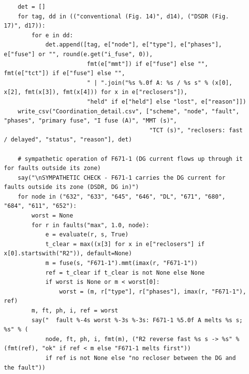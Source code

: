\documentclass[12pt,a4paper]{article}
\begin{document}
\begin{lstlisting}
    det = []
    for tag, dd in (("conventional (Fig. 14)", d14), ("DSDR (Fig. 17)", d17)):
        for e in dd:
            det.append([tag, e["node"], e["type"], e["phases"], e["fuse"] or "", round(e.get("i_fuse", 0)),
                        fmt(e["mmt"]) if e["fuse"] else "", fmt(e["tct"]) if e["fuse"] else "",
                        " | ".join("%s %.0f A: %s / %s s" % (x[0], x[2], fmt(x[3]), fmt(x[4])) for x in e["reclosers"]),
                        "held" if e["held"] else "lost", e["reason"]])
    write_csv("Coordination_detail.csv", ["scheme", "node", "fault", "phases", "primary fuse", "I fuse (A)", "MMT (s)",
                                          "TCT (s)", "reclosers: fast / delayed", "status", "reason"], det)

    # sympathetic operation of F671-1 (DG current flows up through it for faults outside its zone)
    say("\nSYMPATHETIC CHECK - F671-1 carries the DG current for faults outside its zone (DSDR, DG in)")
    for node in ("632", "633", "645", "646", "DL", "671", "680", "684", "611", "652"):
        worst = None
        for r in faults("max", 1.0, node):
            e = evaluate(r, s, True)
            t_clear = max((x[3] for x in e["reclosers"] if x[0].startswith("R2")), default=None)
            m = fuse(s, "F671-1").mmt(imax(r, "F671-1"))
            ref = t_clear if t_clear is not None else None
            if worst is None or m < worst[0]:
                worst = (m, r["type"], r["phases"], imax(r, "F671-1"), ref)
        m, ft, ph, i, ref = worst
        say("  fault %-4s worst %-3s %-3s: F671-1 %5.0f A melts %s s; %s" % (
            node, ft, ph, i, fmt(m), ("R2 reverse fast %s s -> %s" % (fmt(ref), "ok" if ref < m else "F671-1 melts first"))
            if ref is not None else "no recloser between the DG and the fault"))


\end{lstlisting}
\end{document}
